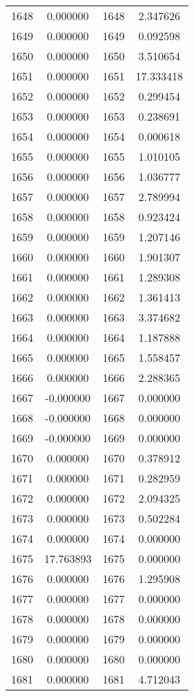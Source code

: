\documentclass[12pt]{article}
\begin{document}
\begin{longtable}{@{}cccc@{}}
1648 & 0.000000 & 1648 & 2.347626 \\
1649 & 0.000000 & 1649 & 0.092598 \\
1650 & 0.000000 & 1650 & 3.510654 \\
1651 & 0.000000 & 1651 & 17.333418 \\
1652 & 0.000000 & 1652 & 0.299454 \\
1653 & 0.000000 & 1653 & 0.238691 \\
1654 & 0.000000 & 1654 & 0.000618 \\
1655 & 0.000000 & 1655 & 1.010105 \\
1656 & 0.000000 & 1656 & 1.036777 \\
1657 & 0.000000 & 1657 & 2.789994 \\
1658 & 0.000000 & 1658 & 0.923424 \\
1659 & 0.000000 & 1659 & 1.207146 \\
1660 & 0.000000 & 1660 & 1.901307 \\
1661 & 0.000000 & 1661 & 1.289308 \\
1662 & 0.000000 & 1662 & 1.361413 \\
1663 & 0.000000 & 1663 & 3.374682 \\
1664 & 0.000000 & 1664 & 1.187888 \\
1665 & 0.000000 & 1665 & 1.558457 \\
1666 & 0.000000 & 1666 & 2.288365 \\
1667 & -0.000000 & 1667 & 0.000000 \\
1668 & -0.000000 & 1668 & 0.000000 \\
1669 & -0.000000 & 1669 & 0.000000 \\
1670 & 0.000000 & 1670 & 0.378912 \\
1671 & 0.000000 & 1671 & 0.282959 \\
1672 & 0.000000 & 1672 & 2.094325 \\
1673 & 0.000000 & 1673 & 0.502284 \\
1674 & 0.000000 & 1674 & 0.000000 \\
1675 & 17.763893 & 1675 & 0.000000 \\
1676 & 0.000000 & 1676 & 1.295908 \\
1677 & 0.000000 & 1677 & 0.000000 \\
1678 & 0.000000 & 1678 & 0.000000 \\
1679 & 0.000000 & 1679 & 0.000000 \\
1680 & 0.000000 & 1680 & 0.000000 \\
1681 & 0.000000 & 1681 & 4.712043 \\

\end{longtable}
\end{document}
